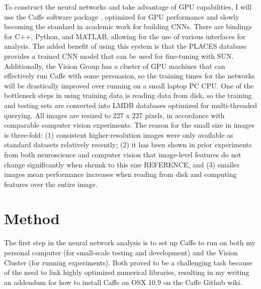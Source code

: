 \documentclass[10pt]{article}
\begin{document}
To construct the neural networks and take advantage of GPU capabilities, I will use the Caffe software package \cite{jia_caffe:_2014}, optimized for GPU performance and slowly becoming the standard in academic work for building CNNs. There are bindings for C++, Python, and MATLAB, allowing for the use of various interfaces for analysis. The added benefit of using this system is that the PLACES database provides a trained CNN model that can be used for fine-tuning with SUN. Additionally, the Vision Group has a cluster of GPU machines that can effectively run Caffe with some persuasion, so the training times for the networks will be drastically improved over running on a small laptop PC CPU. One of the bottleneck steps in using training data is reading data from disk, so the training and testing sets are converted into LMDB databases optimized for multi-threaded querying. All images are resized to 227 x 227 pixels, in accordance with comparable computer vision experiments. The reason for the small size in images is three-fold: (1) consistent higher-resolution images were only available as standard datasets relatively recently; (2) it has been shown in prior experiments from both neuroscience and computer vision that image-level features do not change significantly when shrunk to this size REFERENCE, and (3) smaller images mean performance increases when reading from disk and computing features over the entire image.



\section{Method}

The first step in the neural network analysis is to set up Caffe to run on both my personal computer (for small-scale testing and development) and the Vision Cluster (for running experiments). Both proved to be a challenging task because of the need to link highly optimized numerical libraries, resulting in my writing an addendum for how to install Caffe on OSX 10.9 on the Caffe Github wiki.
\end{document}
